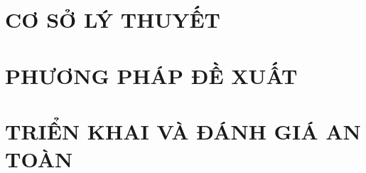 \documentclass[a4paper,13pt,3p,twoside]{report}
\theoremstyle{definition}
\theoremstyle{definition}
\begin{document}
\renewcommand{\listtablename}{DANH MỤC BẢNG BIỂU}
{\let\oldnumberline\numberline
\renewcommand{\numberline}{Bảng~\oldnumberline}
\listoftables}

\glsaddall 
\renewcommand*{\acronymname}{DANH MỤC THUẬT NGỮ VÀ TỪ VIẾT TẮT}
\renewcommand*{\entryname}{Thuật ngữ}
\renewcommand*{\descriptionname}{Ý nghĩa}
\printnoidxglossaries

\raggedbottom




\newpage
{}

\pagestyle{fancy}
\fancyhf{}
\fancyhead[RE, LO]{\leftmark}
\fancyfoot[RE, LO]{\thepage}
\newpage



\newpage
\chapter{CƠ SỞ LÝ THUYẾT}


\newpage
\chapter{PHƯƠNG PHÁP ĐỀ XUẤT}




\newpage
\chapter{TRIỂN KHAI VÀ ĐÁNH GIÁ AN TOÀN}
\label{chap:experiment}

\end{document}
